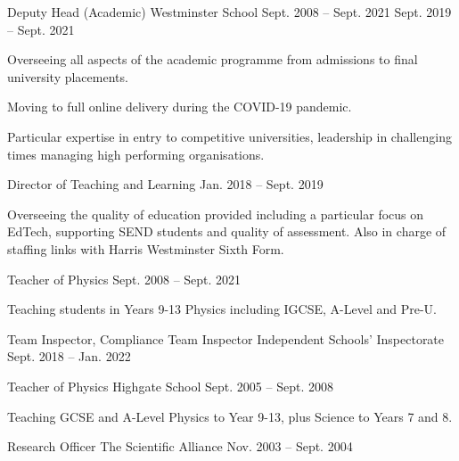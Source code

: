 \documentclass[11pt, a4paper]{awesome-cv}
\begin{document}
\begin{cventries}

    \cventry
      {Deputy Head (Academic)} %
      {Westminster School} %
      {Sept. 2008 -- Sept. 2021} %
      {Sept. 2019 -- Sept. 2021} %
      {
        \begin{cvitems} %
          \item {Overseeing all aspects of the academic programme from admissions to final university placements.}
          \item {Moving to full online delivery during the COVID-19 pandemic.}
          \item {Particular expertise in entry to competitive universities, leadership in challenging times managing high performing organisations.}
        \end{cvitems}
      }

    \cventry
      {Director of Teaching and Learning} %
      {} %
      {} %
      {Jan. 2018 -- Sept. 2019} %
      {
        \begin{cvitems} %
          \item {Overseeing the quality of education provided including a particular focus on EdTech, supporting SEND students and quality of assessment. Also in charge of staffing links with Harris Westminster Sixth Form.}
        \end{cvitems}
      }

    \cventry
      {Teacher of Physics} %
      {} %
      {} %
      {Sept. 2008 -- Sept. 2021} %
      {
        \begin{cvitems} %
          \item {Teaching students in Years 9-13 Physics including IGCSE, A-Level and Pre-U.}
        \end{cvitems}
      }

    \cventry
    {Team Inspector, Compliance Team Inspector} %
    {Independent Schools’ Inspectorate} %
    {Sept. 2018 -- Jan. 2022} %
    {} %
    {
    }

    \cventry
    {Teacher of Physics} %
    {Highgate School} %
    {Sept. 2005 -- Sept. 2008} %
    {} %
    {
      \begin{cvitems} %
        \item {Teaching GCSE and A-Level Physics to Year 9-13, plus Science to Years 7 and 8.}
      \end{cvitems}
    }

    \cventry
    {Research Officer} %
    {The Scientific Alliance} %
    {Nov. 2003 -- Sept. 2004} %
    {} %
    {}

\end{cventries}
\newpage
\end{document}
